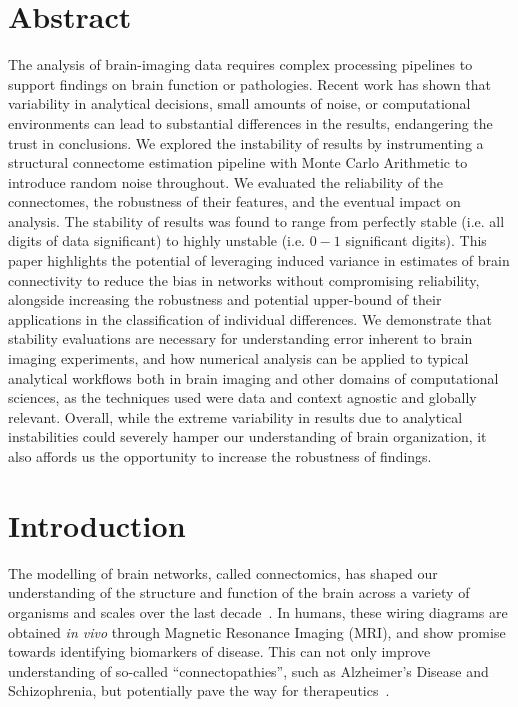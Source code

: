 \documentclass[10pt,letterpaper]{article}
\begin{document}
\section*{Abstract}
The analysis of brain-imaging data requires complex processing pipelines to support
findings on brain function or pathologies. Recent work has shown that variability in
analytical decisions, small amounts of noise, or computational environments can lead
to substantial differences in the results, endangering the trust in conclusions. We
explored the instability of results by instrumenting a structural connectome
estimation pipeline with Monte Carlo Arithmetic to introduce random noise throughout.
We evaluated the reliability of the connectomes, the robustness of their features, and 
the eventual impact on analysis. The stability of results was found to range from
perfectly stable (i.e. all digits of data significant) to highly unstable (i.e. $0-1$
significant digits). This paper highlights the potential of leveraging induced variance
in estimates of brain connectivity to reduce the bias in networks without compromising 
reliability, alongside increasing the robustness and potential upper-bound of their
applications in the classification of individual differences. We demonstrate that
stability evaluations are necessary for understanding error inherent to brain imaging
experiments, and how numerical analysis can be applied to typical analytical workflows 
both in brain imaging and other domains of computational sciences, as the techniques
used were data and context agnostic and globally relevant. Overall, while the extreme
variability in results due to analytical instabilities could severely hamper our
understanding of brain organization, it also affords us the opportunity to increase
the robustness of findings.


\linenumbers

\section*{Introduction}
The modelling of brain networks, called connectomics, has shaped our understanding of
the structure and function of the brain across a variety of organisms and scales over
the last decade~\cite{behrens2012human,xia2016connectomic,morgan2013not,van2016comparative,Rubinov2010-fh,Dubois2016-yr}.
In humans, these wiring diagrams are obtained \textit{in vivo} through Magnetic
Resonance Imaging (MRI), and show promise towards identifying biomarkers of disease.
This can not only improve understanding of so-called ``connectopathies'', such as
Alzheimer's Disease and Schizophrenia, but potentially pave the way for
therapeutics~\cite{fornito2015connectomics,deco2014great,xie2012mapping,filippi2013assessment,van2014brain}.
\end{document}
